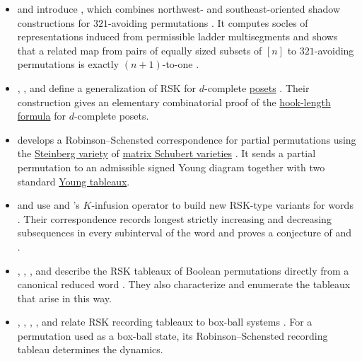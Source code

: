 \begin{itemize}
\item {} and  introduce
\label{mixedRSK}, which combines northwest- and
southeast-oriented shadow
constructions for $321$-avoiding permutations
\cite{FischerReibnegger2026x}.  It computes socles of representations induced
from permissible ladder multisegments and shows that a related map from pairs
of equally sized subsets of $[n]$ to $321$-avoiding permutations is exactly
$(n+1)$-to-one
\cite[Thms.~4.1 and~5.5]{FischerReibnegger2026x}.

\item {}, , and 
define a generalization of RSK for $d$-complete \hyperref[posets]{posets}
\cite{NguyenVulakhWoodruff2025DCompleteRSK}.  Their construction gives an
elementary combinatorial proof of the \hyperref[posetHookFormulas]{hook-length
formula} for $d$-complete posets.

\item {} develops a Robinson--Schensted correspondence for
partial permutations using the \hyperref[varieties]{Steinberg variety} of
\hyperref[schubertVarietiesAndMatroids]{matrix Schubert varieties}
\cite{Singh2020PartialPermutationsRSK}.  It sends a partial permutation to an
admissible signed Young diagram together with two standard
\hyperref[prelimTableaux]{Young tableaux}.

\item {} and  use
 and 's $K$-infusion operator to build
new RSK-type variants for words \cite{BloomSaracino2022x}.  Their
correspondence records longest strictly increasing and decreasing subsequences
in every subinterval of the word and proves a conjecture of
 and .

\item {}, ,
, and  describe the RSK
tableaux of Boolean permutations directly from a canonical reduced word
\cite{GunawanPanRussellTenner2024}.  They also characterize and enumerate the
tableaux that arise in this way.

\item {}, , ,
, and  relate RSK recording tableaux to
box-ball systems \cite{CofieFugikawaGunawanStewartZeng2022x}.  For a
permutation used as a box-ball state, its Robinson--Schensted recording
tableau determines the dynamics.


\end{itemize}
